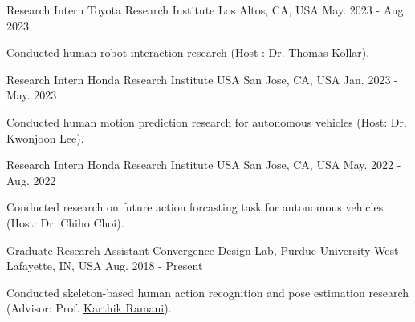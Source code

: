 


\begin{cventries}

\cventry
{Research Intern} %
{Toyota Research Institute} %
{Los Altos, CA, USA} %
{May. 2023 - Aug. 2023} %
{ %
\begin{cvitems}
\item {Conducted human-robot interaction research (Host : Dr. Thomas Kollar).}
\end{cvitems}
}
\vspace{-.5em}


\cventry
{Research Intern} %
{Honda Research Institute USA} %
{San Jose, CA, USA} %
{Jan. 2023 - May. 2023} %
{ %
\begin{cvitems}
\item {Conducted human motion prediction research for autonomous vehicles (Host: Dr. Kwonjoon Lee).}
\end{cvitems}
}
\vspace{-.5em}

\cventry
{Research Intern} %
{Honda Research Institute USA} %
{San Jose, CA, USA} %
{May. 2022 - Aug. 2022} %
{ %
\begin{cvitems}
\item {Conducted research on future action forcasting task for autonomous vehicles (Host: Dr. Chiho Choi).}
\end{cvitems}
}
\vspace{-.5em}

\cventry
{Graduate Research Assistant} %
{Convergence Design Lab, Purdue University} %
{West Lafayette, IN, USA} %
{Aug. 2018 - Present} %
{ %
\begin{cvitems}
\item {Conducted skeleton-based human action recognition and pose estimation research (Advisor: Prof. \href{https://engineering.purdue.edu/~ramani/wordpress/about/}{Karthik Ramani}).}
\end{cvitems}
}
\vspace{-.5em}


\end{cventries}

